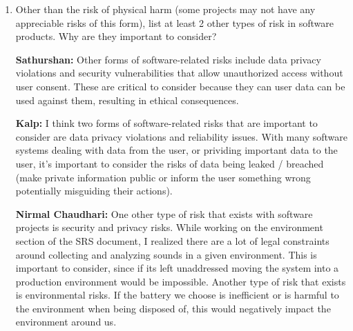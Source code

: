 \documentclass{article}
\begin{document}
\begin{enumerate}
    \item Other than the risk of physical harm (some projects may not have any
    appreciable risks of this form), list at least 2 other types of risk in
    software products. Why are they important to consider?

    \textbf{Sathurshan:} Other forms of software-related risks include data
    privacy violations and security vulnerabilities that allow unauthorized
    access without user consent. These are critical to consider because they can
    user data can be used against them, resulting in ethical consequences.

    \textbf{Kalp:} I think two forms of software-related risks that are 
    important to consider are data privacy violations and reliability issues.
    With many software systems dealing with data from the user, or prividing
    important data to the user, it's important to consider the risks of data 
    being leaked / breached (make private information public or inform the 
    user something wrong potentially misguiding their actions).

    \textbf{Nirmal Chaudhari:} One other type of risk that exists with software 
    projects is security and privacy risks. While working on the environment 
    section of the SRS document, I realized there are a lot of legal constraints
     around collecting and analyzing sounds in a given environment. This is 
     important to consider, since if its left unaddressed moving the system into
      a production environment would be impossible. Another type of risk that 
      exists is environmental risks. If the battery we choose is inefficient or 
      is harmful to the environment when being disposed of, this would 
      negatively impact the environment around us. 
\end{enumerate}
\end{document}
